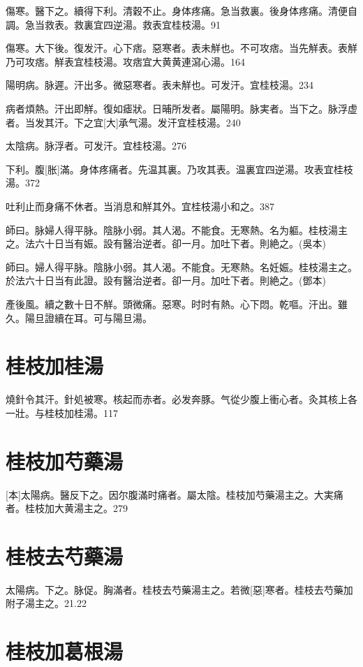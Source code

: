 \documentclass[12pt,oneside,UTF8,b5paper]{ctexbook}她她她她她她她
\begin{document}
傷寒。醫下之。續得下利。清穀不止。身体疼痛。急当救裏。後身体疼痛。清便自調。急当救表。救裏宜四逆湯。救表宜桂枝湯。91

傷寒。大下後。復发汗。心下痞。惡寒者。表未觧也。不可攻痞。当先觧表。表觧乃可攻痞。觧表宜桂枝湯。攻痞宜大黄黄連瀉心湯。164

陽明病。脉遲。汗出多。微惡寒者。表未觧也。可发汗。宜桂枝湯。234

病者煩熱。汗出即觧。復如瘧狀。日晡所发者。屬陽明。脉実者。当下之。脉浮虚者。当发其汗。下之宜[大]承气湯。发汗宜桂枝湯。240

太陰病。脉浮者。可发汗。宜桂枝湯。276

下利。腹[胀]滿。身体疼痛者。先温其裏。乃攻其表。温裏宜四逆湯。攻表宜桂枝湯。372

吐利止而身痛不休者。当消息和觧其外。宜桂枝湯小和之。387

師曰。脉婦人得平脉。陰脉小弱。其人渴。不能食。无寒熱。名为軀。桂枝湯主之。法六十日当有娠。設有醫治逆者。卻一月。加吐下者。則絶之。(吳本)

師曰。婦人得平脉。陰脉小弱。其人渴。不能食。无寒熱。名妊娠。桂枝湯主之。於法六十日当有此證。設有醫治逆者。卻一月。加吐下者。則絶之。(鄧本)

產後風。續之數十日不觧。頭微痛。惡寒。时时有熱。心下悶。乾嘔。汗出。雖久。陽旦證續在耳。可与陽旦湯。

\section{桂枝加桂湯}

燒針令其汗。針処被寒。核起而赤者。必发奔豚。气從少腹上衝心者。灸其核上各一壯。与桂枝加桂湯。117

\section{桂枝加芍藥湯}

[本]太陽病。醫反下之。因尔腹滿时痛者。屬太陰。桂枝加芍藥湯主之。大実痛者。桂枝加大黄湯主之。279

\section{桂枝去芍藥湯}

太陽病。下之。脉促。胸滿者。桂枝去芍藥湯主之。若微[惡]寒者。桂枝去芍藥加附子湯主之。21.22

\section{桂枝加葛根湯}
\end{document}
